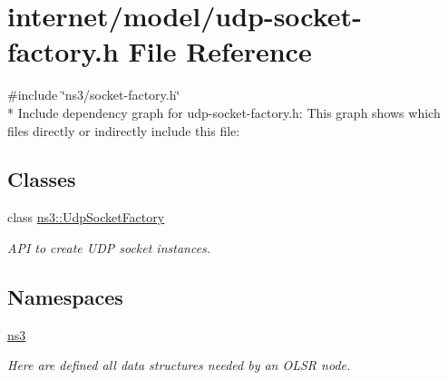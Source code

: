 \hypertarget{udp-socket-factory_8h}{}\section{internet/model/udp-\/socket-\/factory.h File Reference}
\label{udp-socket-factory_8h}
{\ttfamily \#include \char`\"{}ns3/socket-\/factory.\+h\char`\"{}}\\*
Include dependency graph for udp-\/socket-\/factory.h\+:
This graph shows which files directly or indirectly include this file\+:
\subsection*{Classes}
\begin{DoxyCompactItemize}
\item 
class \hyperlink{classns3_1_1UdpSocketFactory}{ns3\+::\+Udp\+Socket\+Factory}
\begin{DoxyCompactList}\small\item\em A\+PI to create U\+DP socket instances. \end{DoxyCompactList}\end{DoxyCompactItemize}
\subsection*{Namespaces}
\begin{DoxyCompactItemize}
\item 
 \hyperlink{namespacens3}{ns3}
\begin{DoxyCompactList}\small\item\em Here are defined all data structures needed by an O\+L\+SR node. \end{DoxyCompactList}\end{DoxyCompactItemize}
